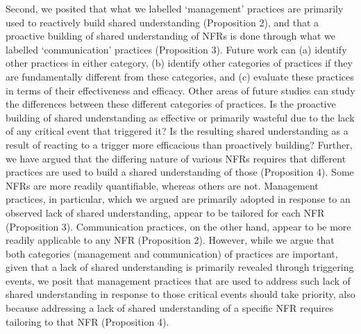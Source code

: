 \documentclass[smallextended]{svjour3}        %
\begin{document}
Second, we posited that what we labelled `management' practices are primarily used to reactively build shared understanding (Proposition 2), and that a proactive building of shared understanding of NFRs is done through what we labelled `communication' practices (Proposition 3). Future work can (a) identify other practices in either category, (b) identify other categories of practices if they are fundamentally different from these categories, and (c) evaluate these practices in terms of their effectiveness and efficacy. 
Other areas of future studies can study the differences between these different categories of practices.
Is the proactive building of shared understanding as effective or primarily wasteful due to the lack of any critical event that triggered it? 
Is the resulting shared understanding as a result of reacting to a trigger more efficacious than proactively building?
Further, we have argued that the differing nature of various NFRs requires that different practices are used to build a shared understanding of those (Proposition 4). Some NFRs are more readily quantifiable, whereas others are not. Management practices, in particular, which we argued are primarily adopted in response to an observed lack of shared understanding, appear to be tailored for each NFR (Proposition 3). Communication practices, on the other hand, appear to be more readily applicable to any NFR (Proposition 2). However, while we argue that both categories (management and communication) of practices are important, given that a lack of shared understanding is primarily revealed through triggering events, we posit that management practices that are used to address such lack of shared understanding in response to those critical events should take priority, also because addressing a lack of shared understanding of a specific NFR requires tailoring to that NFR (Proposition 4).
\end{document}
